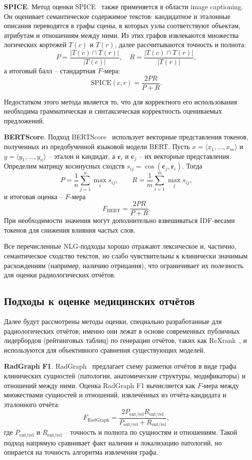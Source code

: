 \textbf{SPICE}. Метод оценки SPICE~\cite{anderson2016spice} также применяется в области image captioning. Он оценивает семантическое содержимое текстов: кандидатное и эталонные описания переводятся в графы сцены, в которых узлы соответствуют объектам, атрибутам и отношениям между ними. Из этих графов извлекаются множества логических кортежей $T(c)$ и $T(r)$, далее рассчитываются точность и полнота:
\[
P = \frac{|T(c)\cap T(r)|}{|T(c)|}, \quad
R = \frac{|T(c)\cap T(r)|}{|T(r)|},
\]
а итоговый балл -- стандартная $F$-мера:
\[
\mathrm{SPICE}(c,r) = \frac{2PR}{P+R}.
\]

Недостатком этого метода является то, что для корректного его использования необходима грамматическая и синтаксическая корректность оцениваемых предложений.

\textbf{BERTScore}. Подход BERTScore~\cite{zhang2020bertscore} использует векторные представления токенов, полученных из предобученной языковой модели BERT. Пусть $x=\langle x_1,\dots,x_m\rangle$ и $y=\langle y_1,\dots,y_n\rangle$ -- эталон и кандидат, а $\mathbf{r}_i$ и $\mathbf{c}_j$ -- их векторные представления. Определим матрицу косинусных сходств $s_{ij} = \cos(\mathbf{c}_j,\mathbf{r}_i)$. Тогда
\[
P = \frac{1}{n} \sum_{j=1}^n \max_i s_{ij}, \qquad
R = \frac{1}{m} \sum_{i=1}^m \max_j s_{ij},
\]
и итоговая оценка -- $F$-мера
\[
F_{\text{BERT}} = \frac{2PR}{P+R}.
\]
При необходимости значения могут дополнительно взвешиваться IDF-весами токенов для снижения влияния частых слов.

Все перечисленные NLG-подходы хорошо отражают лексическое и, частично, семантическое сходство текстов, но слабо чувствительны к клинически значимым расхождениям (например, наличию отрицания), что ограничивает их полезность для оценки радиологических отчётов.

\subsection{Подходы к оценке медицинских отчётов}

Далее будут рассмотрены методы оценки, специально разработанные для радиологических отчётов; именно они лежат в основе современных публичных лидербордов (рейтинговых таблиц) по генерации отчётов, таких как ReXrank~\cite{zhang2024rexrank}, и используются для объективного сравнения существующих моделей.

\textbf{RadGraph F1}. RadGraph~\cite{jain2021radgraph} предлагает схему разметки отчётов в виде графа клинических сущностей (патологии, анатомические структуры, модификаторы) и отношений между ними. Оценка RadGraph F1 вычисляется как $F$-мера между множествами сущностей и отношений, извлечённых из отчёта-кандидата и эталонного отчёта:
\[
F_{\text{RadGraph}} = \frac{2P_{\text{ent/rel}} R_{\text{ent/rel}}}{P_{\text{ent/rel}} + R_{\text{ent/rel}}},
\]
где $P_{\text{ent/rel}}$ и $R_{\text{ent/rel}}$ -- точность и полнота по сущностям и отношениям. Такой подход напрямую сравнивает факт наличия и локализацию патологий, но опирается на точность алгоритма извлечения графа.

